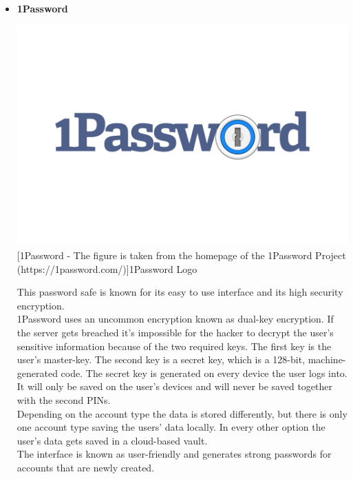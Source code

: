 \documentclass[conference]{IEEEtran}
\begin{document}
\begin{itemize}
\item \textbf{1Password}\\
\begin{center}
\includegraphics[scale=0.06]{./images/1Password-Logo.wine.png}
[1Password - The figure is taken from the homepage of the 1Password Project (https://1password.com/)]{1Password Logo}
\end{center}
This password safe is known for its easy to use interface and its high security encryption.\\ 
1Password uses an uncommon encryption known as dual-key encryption. If the server gets breached it's impossible for the hacker to decrypt the user's sensitive information because of the two required keys. The first key is the user's master-key. The second key is a secret key, which is a 128-bit, machine-generated code. The secret key is generated on every device the user logs into. It will only be saved on the user's devices and will never be saved together with the second PINs.\\
Depending on the account type the data is stored differently, but there is only one account type saving the users' data locally. In every other option the user's data gets saved in a cloud-based vault.\\
The interface is known as user-friendly and generates strong passwords for accounts that are newly created.
\cite{b7}
 
\end{itemize}
\end{document}
